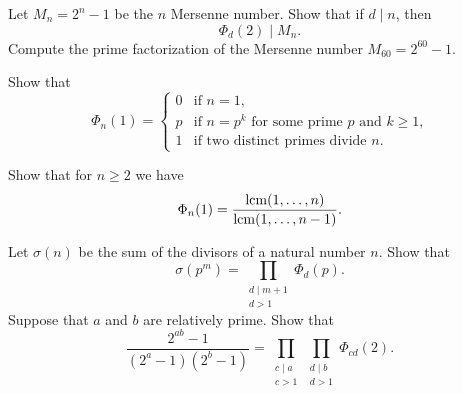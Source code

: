 \exercises

\begin{routine}
  \exercise Let $M_n=2^n-1$ be the $n$\supth{} Mersenne number. Show that if $d\mid n$, then
  \begin{equation*}
    \Phi_d(2)\mid M_n.
  \end{equation*}
  \exercise Compute the prime factorization of the Mersenne number $M_{60}=2^{60}-1$.
  \exercise
  \begin{subexenum}
  \item Show that
    \begin{equation*}
      \Phi_n(1)=
      \begin{cases}
        0 & \text{if $n=1$,} \\
        p & \text{if $n=p^k$ for some prime $p$ and $k\geq 1$,} \\
        1 & \text{if two distinct primes divide $n$.}
      \end{cases}
    \end{equation*}
  \item Show that for $n\geq 2$ we have
    \begin{equation*}
      \Phi_n(1) = \frac{\operatorname*{lcm}(1,\ldots,n)}{\operatorname*{lcm}(1,\ldots,n-1)}.
    \end{equation*}
  \end{subexenum}
  \exercise Let $\sigma(n)$ be the sum of the divisors of a natural number $n$. Show that
  \begin{equation*}
    \sigma(p^m)=\prod_{\substack{d\mid m+1\\d>1}}\Phi_d(p).
  \end{equation*}
  \exercise Suppose that $a$ and $b$ are relatively prime. Show that
  \begin{equation*}
    \frac{2^{ab}-1}{(2^a-1)(2^b-1)}=\prod_{\substack{c\mid a\\ c>1}}\prod_{\substack{d\mid b\\ d>1}} \Phi_{cd}(2).
  \end{equation*}
\end{routine}



